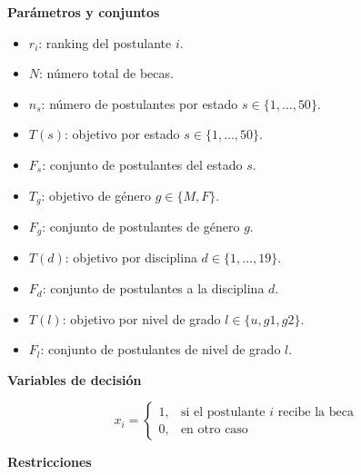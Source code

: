 \textbf{Parámetros y conjuntos}

\begin{itemize}
    \item $r_i$: ranking del postulante $i$.
    \item $N$: número total de becas.
    \item $n_s$: número de postulantes por estado $s \in \{1,\ldots,50\}$.
    \item $T(s)$: objetivo por estado $s \in \{1,\ldots,50\}$.
    \item $F_s$: conjunto de postulantes del estado $s$.
    \item $T_g$: objetivo de género $g \in \{M,F\}$.
    \item $F_g$: conjunto de postulantes de género $g$.
    \item $T(d)$: objetivo por disciplina $d \in \{1,\ldots,19\}$.
    \item $F_d$: conjunto de postulantes a la disciplina $d$.
    \item $T(l)$: objetivo por nivel de grado $l \in \{u,g1,g2\}$.
    \item $F_l$: conjunto de postulantes de nivel de grado $l$.
\end{itemize}

\textbf{Variables de decisión}

\begin{equation}
x_i =
\begin{cases}
1, & \text{si el postulante } i \text{ recibe la beca} \\
0, & \text{en otro caso}
\end{cases}
\end{equation}

\textbf{Restricciones}

